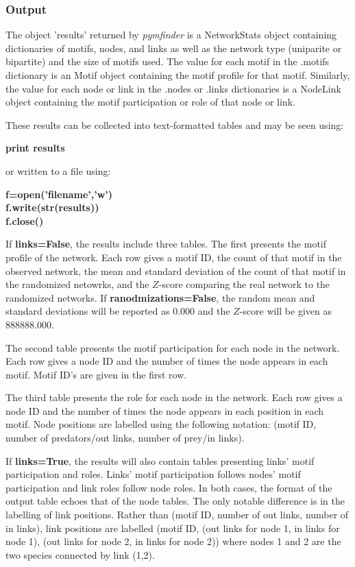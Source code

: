 \documentclass[12pt]{article}
\begin{document}
		\subsubsection{Output}

			The object 'results' returned by \emph{pymfinder} is a NetworkStats object containing dictionaries of motifs, nodes, and links as well as the network type (uniparite or bipartite) and the size of motifs used. The value for each motif in the .motifs dictionary is an Motif object containing the motif profile for that motif. Similarly, the value for each node or link in the .nodes or .links dictionaries is a NodeLink object containing the motif participation or role of that node or link.


			These results can be collected into text-formatted tables and may be seen using:

			\textbf{print results}

			or written to a file using:

			\textbf{f=open('filename','w')\\
					f.write(str(results))\\
					f.close()}\\
			\medskip


			If \textbf{links=False}, the results include three tables. The first presents the motif profile of the network. Each row gives a motif ID, the count of that motif in the observed network, the mean and standard deviation of the count of that motif in the randomized netowrks, and the $Z$-score comparing the real network to the randomized networks. If \textbf{ranodmizations=False}, the random mean and standard deviations will be reported as 0.000 and the $Z$-score will be given as 888888.000.



			The second table presents the motif participation for each node in the network. Each row gives a node ID and the number of times the node appears in each motif. Motif ID's are given in the first row.


			The third table presents the role for each node in the network. Each row gives a node ID and the number of times the node appears in each position in each motif. Node positions are labelled using the following notation: (motif ID, number of predators/out links, number of prey/in links).


			If \textbf{links=True}, the results will also contain tables presenting links' motif participation and roles. Links' motif participation follows nodes' motif participation and link roles follow node roles. In both cases, the format of the output table echoes that of the node tables. The only notable difference is in the labelling of link positions. Rather than (motif ID, number of out links, number of in links), link positions are labelled (motif ID, (out links for node 1, in links for node 1), (out links for node 2, in links for node 2)) where nodes 1 and 2 are the two species connected by link (1,2).
\end{document}
